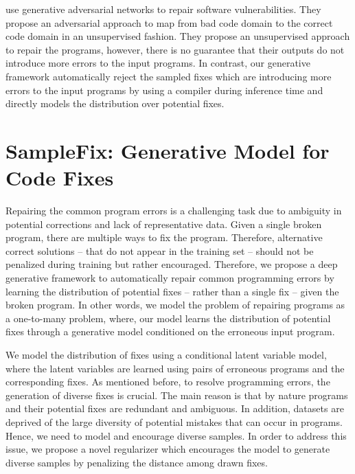\documentclass[letterpaper]{article} \usepackage{aaai20}  \usepackage{times}  \usepackage{helvet} \usepackage{courier}  \usepackage[hyphens]{url}  \usepackage{graphicx}
\begin{document}
\citeauthor{harrer18learning-to-repair} use generative adversarial networks to repair software vulnerabilities. They propose an adversarial approach to map from bad code domain to the correct code domain in an unsupervised fashion. They propose an unsupervised approach to repair the programs, however, there is no guarantee that their outputs do not introduce more errors to the input programs. In contrast, our generative framework automatically reject the sampled fixes which are introducing more errors to the input programs by using a compiler during inference time and directly models the distribution over potential fixes. 

\section{SampleFix: Generative Model for Code Fixes} 


Repairing the common program errors is a challenging task due to ambiguity in potential corrections and lack of representative data. Given a single broken program, there are multiple ways to fix the program. Therefore, alternative correct solutions -- that do not appear in the training set --  should not be penalized during training but rather encouraged. Therefore, we propose a deep generative framework to automatically repair common programming errors by learning the distribution of potential fixes -- rather than a single fix -- given the broken program. In other words, we model the problem of repairing programs as a one-to-many problem, where, our model learns the distribution of potential fixes through a generative model conditioned on the erroneous input program.  

We model the distribution of fixes using a conditional latent variable model, where the latent variables are learned using pairs of erroneous programs and the corresponding fixes. As mentioned before, to resolve programming errors, the generation of diverse fixes is crucial. The main reason is that by nature programs and their potential fixes are redundant and ambiguous. In addition, datasets are deprived of the large diversity of potential mistakes that can occur in programs. Hence, we need to model and encourage diverse samples. In order to address this issue, we propose a novel regularizer which encourages the model to generate diverse samples by penalizing the distance among drawn fixes.
\end{document}
